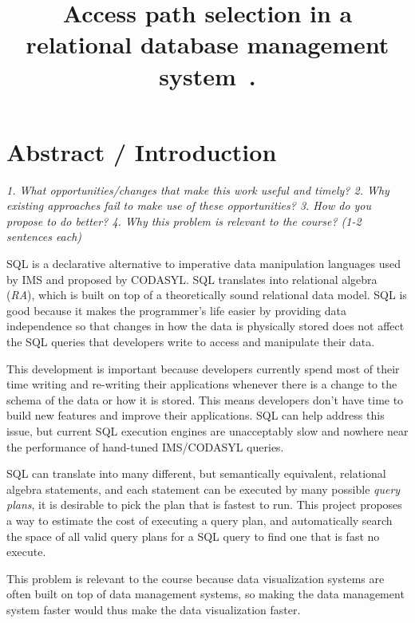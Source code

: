 \documentclass[10pt, sigconf]{acmart}
\begin{document}
\title{Access path selection in a relational database management system~\cite{selinger1979access}.}


\maketitle

\section{Abstract / Introduction}

\emph{1. What opportunities/changes that make this work useful and timely?
2. Why existing approaches fail to make use of these opportunities?
3. How do you propose to do better?
4. Why this problem is relevant to the course?
(1-2 sentences each)} 

SQL is a declarative alternative to imperative data manipulation languages used by IMS and proposed by CODASYL.   
SQL translates into relational algebra (\emph{RA}), which is built on top of a theoretically sound relational data model.  
SQL is good because it makes the programmer's life easier by providing data independence so that changes in how the data is physically stored does not affect the SQL queries that developers write to access and manipulate their data.

This development is important because developers currently spend most of their time writing and re-writing their applications whenever there is a change to the schema of the data or how it is stored.  This means developers don't have time to build new features and improve their applications.  SQL can help address this issue, but current SQL execution engines are unacceptably slow and nowhere near the performance of hand-tuned IMS/CODASYL queries.

SQL can translate into many different, but semantically equivalent, relational algebra statements, and each statement can be executed by many possible \emph{query plans},  it is desirable to pick the plan that is fastest to run. This project proposes a way to estimate the cost of executing a query plan, and automatically search the space of all valid query plans for a SQL query to find one that is fast no execute. 

This problem is relevant to the course because data visualization systems are often built on top of data management systems, so making the data management system faster would thus make the data visualization faster.
\end{document}
